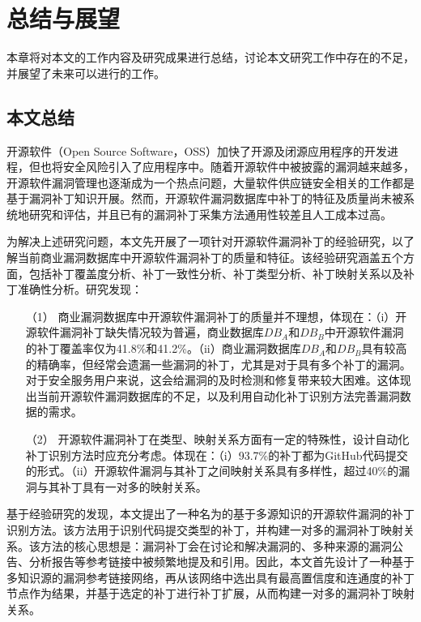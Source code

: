 \chapter{总结与展望}

本章将对本文的工作内容及研究成果进行总结，讨论本文研究工作中存在的不足，并展望了未来可以进行的工作。

\section{本文总结}
开源软件（Open Source Software，OSS）加快了开源及闭源应用程序的开发进程，但也将安全风险引入了应用程序中。随着开源软件中被披露的漏洞越来越多，开源软件漏洞管理也逐渐成为一个热点问题，大量软件供应链安全相关的工作都是基于漏洞补丁知识开展。然而，开源软件漏洞数据库中补丁的特征及质量尚未被系统地研究和评估，并且已有的漏洞补丁采集方法通用性较差且人工成本过高。

为解决上述研究问题，本文先开展了一项针对开源软件漏洞补丁的经验研究，以了解当前商业漏洞数据库中开源软件漏洞补丁的质量和特征。该经验研究涵盖五个方面，包括补丁覆盖度分析、补丁一致性分析、补丁类型分析、补丁映射关系以及补丁准确性分析。研究发现：
\begin{enumerate}
    \item [（1）]商业漏洞数据库中开源软件漏洞补丁的质量并不理想，体现在：（i）开源软件漏洞补丁缺失情况较为普遍，商业数据库$DB_A$和$DB_B$中开源软件漏洞的补丁覆盖率仅为41.8\%和41.2\%。（ii）商业漏洞数据库$DB_A$和$DB_B$具有较高的精确率，但经常会遗漏一些漏洞的补丁，尤其是对于具有多个补丁的漏洞。对于安全服务用户来说，这会给漏洞的及时检测和修复带来较大困难。这体现出当前开源软件漏洞数据库的不足，以及利用自动化补丁识别方法完善漏洞数据的需求。
    \item [（2）]开源软件漏洞补丁在类型、映射关系方面有一定的特殊性，设计自动化补丁识别方法时应充分考虑。体现在：（i）93.7\%的补丁都为GitHub代码提交的形式。（ii）开源软件漏洞与其补丁之间映射关系具有多样性，超过40\%的漏洞与其补丁具有一对多的映射关系。
\end{enumerate}

基于经验研究的发现，本文提出了一种名为\tool 的基于多源知识的开源软件漏洞的补丁识别方法。该方法用于识别代码提交类型的补丁，并构建一对多的漏洞补丁映射关系。该方法的核心思想是：漏洞补丁会在讨论和解决漏洞的、多种来源的漏洞公告、分析报告等参考链接中被频繁地提及和引用。因此，本文首先设计了一种基于多知识源的漏洞参考链接网络，再从该网络中选出具有最高置信度和连通度的补丁节点作为结果，并基于选定的补丁进行补丁扩展，从而构建一对多的漏洞补丁映射关系。


